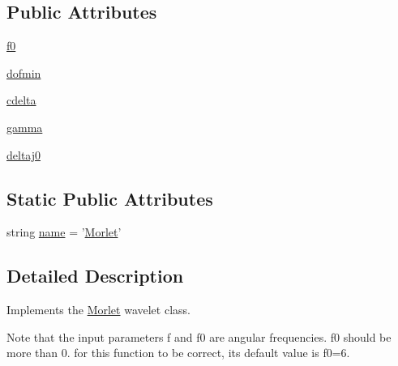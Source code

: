 \subsection*{Public Attributes}
\begin{DoxyCompactItemize}
\item 
\hyperlink{classprojects_1_1piwavelet_1_1piwavelet_1_1piwavelet_1_1Morlet_ab682fa210faa6f3b3d6d3f371eed36e9}{f0}
\item 
\hyperlink{classprojects_1_1piwavelet_1_1piwavelet_1_1piwavelet_1_1Morlet_a4264196db188abdf30268ac2b83a8328}{dofmin}
\item 
\hyperlink{classprojects_1_1piwavelet_1_1piwavelet_1_1piwavelet_1_1Morlet_a95ad01ac82fa9ed948e91c30c0078c70}{cdelta}
\item 
\hyperlink{classprojects_1_1piwavelet_1_1piwavelet_1_1piwavelet_1_1Morlet_ad72b0cd3389a481379383d4a31c9534f}{gamma}
\item 
\hyperlink{classprojects_1_1piwavelet_1_1piwavelet_1_1piwavelet_1_1Morlet_a6f088682a6fbc9fce8be389dcf86ea21}{deltaj0}
\end{DoxyCompactItemize}
\subsection*{Static Public Attributes}
\begin{DoxyCompactItemize}
\item 
string \hyperlink{classprojects_1_1piwavelet_1_1piwavelet_1_1piwavelet_1_1Morlet_a54fb1b558bd3f992e78452f41c5582b3}{name} = '\hyperlink{classprojects_1_1piwavelet_1_1piwavelet_1_1piwavelet_1_1Morlet}{Morlet}'
\end{DoxyCompactItemize}


\subsection{Detailed Description}
Implements the \hyperlink{classprojects_1_1piwavelet_1_1piwavelet_1_1piwavelet_1_1Morlet}{Morlet} wavelet class. 

Note that the input parameters f and f0 are angular frequencies. f0 should be more than 0. for this function to be correct, its default value is f0=6. 

